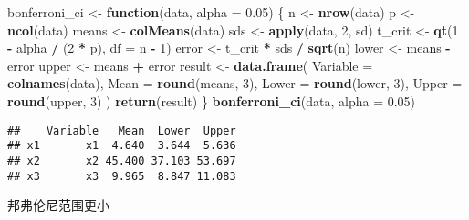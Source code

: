 \documentclass[
]{ctex}
\newenvironment{Shaded}{\begin{snugshade}}{\end{snugshade}}
\newcommand{\AttributeTok}[1]{\textcolor[rgb]{0.13,0.29,0.53}{#1}}
\newcommand{\ControlFlowTok}[1]{\textcolor[rgb]{0.13,0.29,0.53}{\textbf{#1}}}
\newcommand{\DecValTok}[1]{\textcolor[rgb]{0.00,0.00,0.81}{#1}}
\newcommand{\FloatTok}[1]{\textcolor[rgb]{0.00,0.00,0.81}{#1}}
\newcommand{\FunctionTok}[1]{\textcolor[rgb]{0.13,0.29,0.53}{\textbf{#1}}}
\newcommand{\NormalTok}[1]{#1}
\newcommand{\OtherTok}[1]{\textcolor[rgb]{0.56,0.35,0.01}{#1}}
\newcommand{\SpecialCharTok}[1]{\textcolor[rgb]{0.81,0.36,0.00}{\textbf{#1}}}
\begin{document}
\begin{Shaded}
\begin{Highlighting}[]
\NormalTok{bonferroni\_ci }\OtherTok{\textless{}{-}} \ControlFlowTok{function}\NormalTok{(data, }\AttributeTok{alpha =} \FloatTok{0.05}\NormalTok{) \{}
\NormalTok{  n }\OtherTok{\textless{}{-}} \FunctionTok{nrow}\NormalTok{(data)}
\NormalTok{  p }\OtherTok{\textless{}{-}} \FunctionTok{ncol}\NormalTok{(data)}
\NormalTok{  means }\OtherTok{\textless{}{-}} \FunctionTok{colMeans}\NormalTok{(data)}
\NormalTok{  sds }\OtherTok{\textless{}{-}} \FunctionTok{apply}\NormalTok{(data, }\DecValTok{2}\NormalTok{, sd)}
\NormalTok{  t\_crit }\OtherTok{\textless{}{-}} \FunctionTok{qt}\NormalTok{(}\DecValTok{1} \SpecialCharTok{{-}}\NormalTok{ alpha }\SpecialCharTok{/}\NormalTok{ (}\DecValTok{2} \SpecialCharTok{*}\NormalTok{ p), }\AttributeTok{df =}\NormalTok{ n }\SpecialCharTok{{-}} \DecValTok{1}\NormalTok{)}
\NormalTok{  error }\OtherTok{\textless{}{-}}\NormalTok{ t\_crit }\SpecialCharTok{*}\NormalTok{ sds }\SpecialCharTok{/} \FunctionTok{sqrt}\NormalTok{(n)}
\NormalTok{  lower }\OtherTok{\textless{}{-}}\NormalTok{ means }\SpecialCharTok{{-}}\NormalTok{ error}
\NormalTok{  upper }\OtherTok{\textless{}{-}}\NormalTok{ means }\SpecialCharTok{+}\NormalTok{ error}
\NormalTok{  result }\OtherTok{\textless{}{-}} \FunctionTok{data.frame}\NormalTok{(}
    \AttributeTok{Variable =} \FunctionTok{colnames}\NormalTok{(data),}
    \AttributeTok{Mean =} \FunctionTok{round}\NormalTok{(means, }\DecValTok{3}\NormalTok{),}
    \AttributeTok{Lower =} \FunctionTok{round}\NormalTok{(lower, }\DecValTok{3}\NormalTok{),}
    \AttributeTok{Upper =} \FunctionTok{round}\NormalTok{(upper, }\DecValTok{3}\NormalTok{)}
\NormalTok{  )}
  \FunctionTok{return}\NormalTok{(result)}
\NormalTok{\}}
\FunctionTok{bonferroni\_ci}\NormalTok{(data, }\AttributeTok{alpha =} \FloatTok{0.05}\NormalTok{)}
\end{Highlighting}
\end{Shaded}

\begin{verbatim}
##    Variable   Mean  Lower  Upper
## x1       x1  4.640  3.644  5.636
## x2       x2 45.400 37.103 53.697
## x3       x3  9.965  8.847 11.083
\end{verbatim}

邦弗伦尼范围更小
\end{document}
